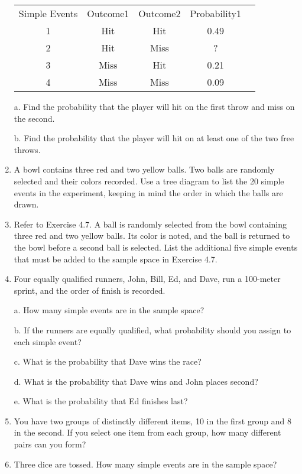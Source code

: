 \documentclass{article}
\begin{document}
\begin{enumerate}
    \begin{center}
    \begin{tabular}{|c|c|c|c|c|}
        \hline
        Simple Events & Outcome1 & Outcome2 & Probability1 \\
        1 & Hit & Hit & 0.49 \\
        2 & Hit & Miss & ? \\
        3 & Miss & Hit & 0.21 \\
        4 & Miss & Miss & 0.09 \\
        \hline
    \end{tabular}
\end{center}
a. Find the probability that the player will hit on the first throw and miss on the second.

b. Find the probability that the player will hit on at least one of the two free throws.

\item A bowl contains three red and two yellow balls. Two balls are randomly selected and their colors recorded. Use a tree diagram to list the 20 simple events in the experiment, keeping in mind the order in which the balls are drawn.

\item Refer to Exercise 4.7. A ball is randomly selected from the bowl containing three red and two yellow balls. Its color is noted, and the ball is returned to the bowl before a second ball is selected. List the additional five simple events that must be added to the sample space in Exercise 4.7.


\item Four equally qualified runners, John, Bill, Ed, and Dave, run a 100-meter sprint, and the order of finish is recorded.

a. How many simple events are in the sample space?

b. If the runners are equally qualified, what probability should you assign to each simple event?

c. What is the probability that Dave wins the race?

d. What is the probability that Dave wins and John places second?

e. What is the probability that Ed finishes last?

\item You have two groups of distinctly different items, 10 in the first group and 8 in the second. If you select one item from each group, how many different pairs can you form?
\item Three dice are tossed. How many simple events are in the sample space?



\end{enumerate}
\end{document}
